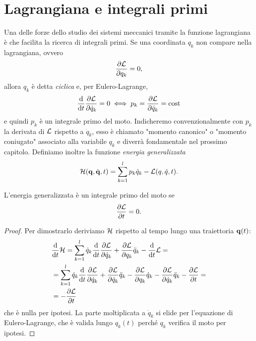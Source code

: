    \section{Lagrangiana e integrali primi}
   Una delle forze dello studio dei sistemi meccanici tramite la funzione lagrangiana è che facilita la ricerca di integrali primi. Se una coordinata $q_k$ non compare nella lagrangiana, ovvero
   \begin{equation}
       \frac{\partial \mathcal{L}}{\partial q_k} = 0,
   \end{equation}
   allora $q_k$ è detta \emph{ciclica} e, per Eulero-Lagrange, 
   \begin{equation}
       \frac{\mathrm{d}}{\mathrm{d}t} \frac{\partial \mathcal{L}}{\partial \dot{q}_k} = 0 \iff p_k=\frac{\partial \mathcal{L}}{\partial \dot{q}_k} = \mathrm{cost}
   \end{equation}
   e quindi $p_k$ è un integrale primo del moto. Indicheremo convenzionalmente con $p_k$ la derivata di $\mathcal{L}$ rispetto a $\dot{q}_k$, esso è chiamato "momento canonico" o "momento coniugato" associato alla variabile $q_k$ e diverrà fondamentale nel prossimo capitolo. Definiamo inoltre la funzione \emph{energia generalizzata}
   \begin{equation}
       \mathcal{H}(\mathbf{q}, \dot{\mathbf{q}},t) = \sum_{k=1}^l p_k \dot{q}_k -\mathcal{L} (q, \dot{q},t).
   \end{equation}
   \begin{theorem}
       L'energia generalizzata è un integrale primo del moto se
       \begin{equation}
           \frac{\partial \mathcal{L}}{\partial t} = 0.
       \end{equation}
   \end{theorem}
   \begin{proof}
       Per dimostrarlo deriviamo $\mathcal{H}$ rispetto al tempo lungo una traiettoria $\mathbf{q}(t)$:
       \begin{equation}
       \begin{aligned}
       &\frac{\mathrm{d}}{\mathrm{d}t} \mathcal{H} = \sum_{k=1}^{l} \dot{q}_k \frac{\mathrm{d}}{\mathrm{d}t} \frac{\partial \mathcal{L}}{\partial \dot{q}_k} + \frac{\partial \mathcal{L}}{\partial q_k} \ddot{q}_k - \frac{\mathrm{d}}{\mathrm{d}t} \mathcal{L}= \\
       & = \sum_{k=1}^{l} \dot{q}_k \frac{\mathrm{d}}{\mathrm{d}t} \frac{\partial \mathcal{L}}{\partial \dot{q}_k} + \frac{\partial \mathcal{L}}{\partial \dot{q}_k} \ddot{q}_k - \frac{\partial \mathcal{L}}{\partial q_k}\dot{q}_k - \frac{\partial \mathcal{L}}{\partial \dot{q}_k}\ddot{q}_k - \frac{\partial \mathcal{L}}{\partial t}=\\
       &= - \frac{\partial \mathcal{L}}{\partial t}
       \end{aligned}
       \end{equation}
       che è nulla per ipotesi. La parte moltiplicata a $\dot{q}_k$ si elide per l'equazione di Eulero-Lagrange, che è valida lungo $q_k(t)$ perché $q_k$ verifica il moto per ipotesi.
   \end{proof}
